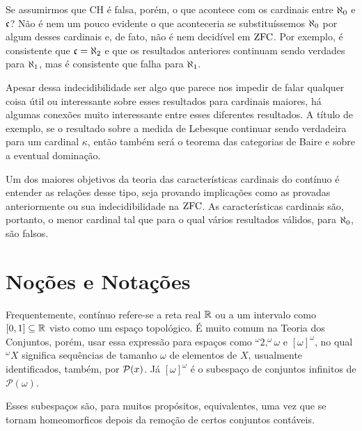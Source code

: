 Se assumirmos que CH é falsa, porém, o que acontece com os cardinais entre $\aleph_0$ e $\mathfrak{c}$? Não é nem um pouco evidente o que aconteceria se substituíssemos $\aleph_0$ por algum desses cardinais e, de fato, não é nem decidível em $\operatorname{ZFC}$. Por exemplo, é consistente que $\mathfrak{c} = \aleph_2$ e que os resultados anteriores continuam sendo verdades para $\aleph_1$, mas é consistente que falha para $\aleph_1$. 

Apesar dessa indecidibilidade ser algo que parece nos impedir de falar qualquer coisa útil ou interessante sobre esses resultados para cardinais maiores, há algumas conexões muito interessante entre esses diferentes resultados. A título de exemplo, se o resultado sobre a medida de Lebesque continuar sendo verdadeira para um cardinal $\kappa$, então também será o teorema das categorias de Baire e sobre a eventual dominação. 

Um dos maiores objetivos da teoria das características cardinais do contínuo é entender as relações desse tipo, seja provando implicações como as provadas anteriormente ou sua indecidibilidade na $\operatorname{ZFC}$. As características cardinais são, portanto, o menor cardinal tal que para o qual vários resultados válidos, para $\aleph_0$, são falsos. 

\section{Noções e Notações}

Frequentemente, contínuo refere-se a reta real $\mathbb{R}$ ou a um intervalo como $[0,1] \subseteq \mathbb{R}$ visto como um espaço topológico. É muito comum na Teoria dos Conjuntos, porém, usar essa expressão para espaços como $^\omega 2, ^\omega \omega$ e $[\omega]^\omega$, no qual $^\omega X$ significa sequências de tamanho $\omega$ de elementos de $X$, usualmente identificados, também, por $\mathcal{P}(x)$. Já $[\omega]^\omega$ é o subespaço de conjuntos infinitos de $\mathcal P(\omega)$.

Esses subespaços são, para muitos propósitos, equivalentes, uma vez que se tornam homeomorficos depois da remoção de certos conjuntos contáveis.
